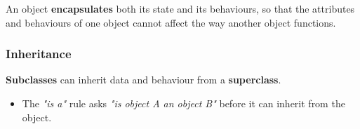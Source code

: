 An object \textbf{encapsulates} both its state and its behaviours, so that the attributes and behaviours of one object cannot affect the way another object functions.

\subsubsection*{Inheritance}

\textbf{Subclasses} can inherit data and behaviour from a \textbf{superclass}.

\begin{itemize}
    \item The \emph{"is a"} rule asks \emph{"is object A an object B"} before it can inherit from the object.
\end{itemize}
